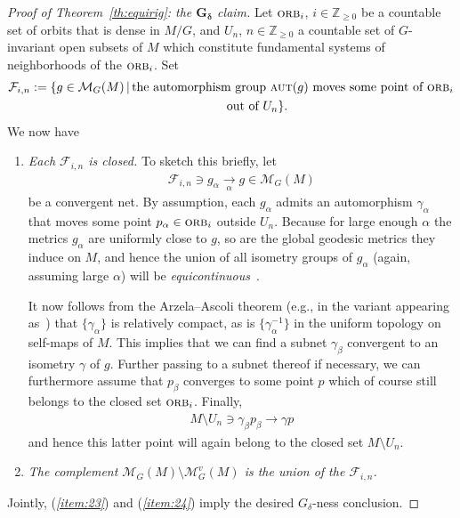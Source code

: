 \documentclass[pdftex]{sigma}%
\numberwithin{equation}{section}
\newcommand{\cat}[1]{\textsc{#1}}
\begin{document}
\begin{proof}[Proof of Theorem~\ref{th:equirig}: the $\boldsymbol{G_{\delta}}$ claim]
 Let $\cat{orb}_i$, $i\in \mathbb{Z}_{\ge 0}$ be a countable set of orbits that is dense in $M/G$, and $U_n$, $n\in \mathbb{Z}_{\ge 0}$ a countable set of $G$-invariant open subsets of $M$ which constitute fundamental systems of neighborhoods of the $\cat{orb}_i$. Set
 \begin{gather*}
 \mathcal{F}_{i,n}:=\{g\in \mathcal{M}_G(M)\,|\, \text{the automorphism group }\cat{aut}(g)\text{ moves some point of }\cat{orb}_i
 \\ \hphantom{\mathcal{F}_{i,n}:=\{}
 \text{ out of }U_n\}.
 \end{gather*}
 We now have
 \begin{enumerate}[$(i)$]
 \item\label{item:23} {\it Each $\mathcal{F}_{i,n}$ is closed.} To sketch this briefly, let
 \begin{gather*}
 \mathcal{F}_{i,n}\ni g_{\alpha}\underset{\alpha}{\longrightarrow} g\in \mathcal{M}_G(M)
 \end{gather*}
 be a convergent net. By assumption, each $g_{\alpha}$ admits an automorphism $\gamma_{\alpha}$ that moves some point $p_{\alpha}\in \cat{orb}_i$ outside $U_n$. Because for large enough $\alpha$ the metrics $g_{\alpha}$ are uniformly close to $g$, so are the global geodesic metrics they induce on $M$, and hence the union of all isometry groups of $g_{\alpha}$ (again, assuming large $\alpha$) will be {\it equicontinuous}~\cite[Section~45, Definition]{mun}.

 It now follows from the Arzela--Ascoli theorem (e.g., in the variant appearing as~\cite[Theorem~47.1]{mun}) that $\{\gamma_{\alpha}\}$ is relatively compact, as is $\{\gamma_{\alpha}^{-1}\}$ in the uniform topology on self-maps of $M$. This implies that we can find a subnet $\gamma_{\beta}$ convergent to an isometry $\gamma$ of $g$. Further passing to a subnet thereof if necessary, we can furthermore assume that $p_{\beta}$ converges to some point $p$ which of course still belongs to the closed set $\cat{orb}_i$. Finally,
 \begin{gather*}
 M\setminus U_n\ni \gamma_{\beta} p_{\beta} \to \gamma p
 \end{gather*}
 and hence this latter point will again belong to the closed set $M\setminus U_n$.
 \item\label{item:24} {\it The complement $\mathcal{M}_G(M)\setminus \mathcal{M}^v_G(M)$ is the union of the $\mathcal{F}_{i,n}$.}
 \end{enumerate}
 Jointly, ({\it \ref{item:23}}) and ({\it \ref{item:24}}) imply the desired $G_{\delta}$-ness conclusion.
\end{proof}
\end{document}

